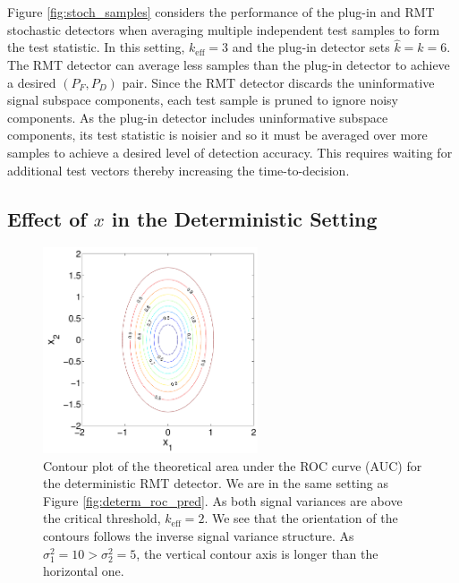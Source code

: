 Figure \ref{fig:stoch_samples} considers the performance of the plug-in and RMT stochastic detectors when averaging multiple independent test samples to form the test statistic. In this setting, $k_\text{eff} =3$ and the plug-in detector sets $\widehat{k} = k = 6$. The RMT detector can average less samples than the plug-in detector to achieve a desired $(P_F, P_D)$ pair. Since the RMT detector discards the uninformative signal subspace components, each test sample is pruned to ignore noisy components. As the plug-in detector includes uninformative subspace components, its test statistic is noisier and so it must be averaged over more samples to achieve a desired level of detection accuracy. This requires waiting for additional test vectors thereby increasing the time-to-decision.

\subsection{Effect of $x$ in the Deterministic Setting}
\begin{figure}[t]
\centering
\includegraphics[width=2.5in]{figures/determ_rmt_theory_contour_large_keff.pdf}
\caption{Contour plot of the theoretical area under the ROC curve (AUC) for the deterministic RMT detector. We are in the same setting as Figure \ref{fig:determ_roc_pred}. As both signal variances are above the critical threshold, $k_{\text{eff}} = 2$. We see that the orientation of the contours follows the inverse signal variance structure. As $\sigma_1^2=10 > \sigma_2^2=5$, the vertical contour axis is longer than the horizontal one. }
\label{fig:determ_rmt_theory_contour}
\end{figure}

